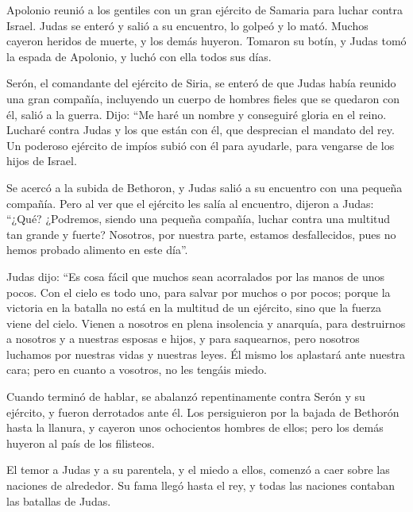  Apolonio reunió a los gentiles con un gran ejército de
Samaria para luchar contra Israel.  Judas se enteró y
salió a su encuentro, lo golpeó y lo mató. Muchos cayeron heridos de
muerte, y los demás huyeron.  Tomaron su botín, y Judas
tomó la espada de Apolonio, y luchó con ella todos sus días.

 Serón, el comandante del ejército de Siria, se enteró de
que Judas había reunido una gran compañía, incluyendo un cuerpo de
hombres fieles que se quedaron con él, salió a la guerra.
 Dijo: ``Me haré un nombre y conseguiré gloria en el
reino. Lucharé contra Judas y los que están con él, que desprecian el
mandato del rey.  Un poderoso ejército de impíos subió
con él para ayudarle, para vengarse de los hijos de Israel.

 Se acercó a la subida de Bethoron, y Judas salió a su
encuentro con una pequeña compañía.  Pero al ver que el
ejército les salía al encuentro, dijeron a Judas: ``¿Qué? ¿Podremos,
siendo una pequeña compañía, luchar contra una multitud tan grande y
fuerte? Nosotros, por nuestra parte, estamos desfallecidos, pues no
hemos probado alimento en este día''.

 Judas dijo: ``Es cosa fácil que muchos sean acorralados
por las manos de unos pocos. Con el cielo es todo uno, para salvar por
muchos o por pocos;  porque la victoria en la batalla no
está en la multitud de un ejército, sino que la fuerza viene del cielo.
 Vienen a nosotros en plena insolencia y anarquía, para
destruirnos a nosotros y a nuestras esposas e hijos, y para saquearnos,
 pero nosotros luchamos por nuestras vidas y nuestras
leyes.  Él mismo los aplastará ante nuestra cara; pero en
cuanto a vosotros, no les tengáis miedo.

 Cuando terminó de hablar, se abalanzó repentinamente
contra Serón y su ejército, y fueron derrotados ante él. 
Los persiguieron por la bajada de Bethorón hasta la llanura, y cayeron
unos ochocientos hombres de ellos; pero los demás huyeron al país de los
filisteos.

 El temor a Judas y a su parentela, y el miedo a ellos,
comenzó a caer sobre las naciones de alrededor.  Su fama
llegó hasta el rey, y todas las naciones contaban las batallas de Judas.

